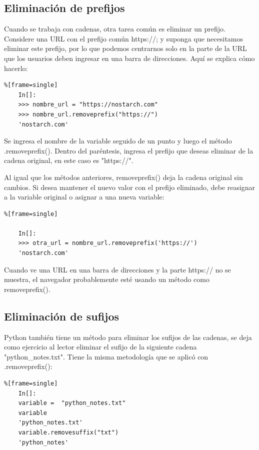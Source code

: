 \subsection{Eliminación de prefijos}%

Cuando se trabaja con cadenas, otra tarea común es eliminar un prefijo. Considere una URL con el prefijo común {\ttfamily https://}; y suponga que necesitamos  eliminar este prefijo, por lo que podemos centrarnos solo en la parte de la URL que los usuarios deben ingresar en una barra de direcciones. Aquí se explica cómo hacerlo:

\begin{lstlisting}%[frame=single]
	In[]:	
	>>> nombre_url = "https://nostarch.com"
	>>> nombre_url.removeprefix("https://")
	'nostarch.com'
\end{lstlisting}


\noindent Se ingresa el nombre de la variable seguido de un punto y luego el método
{\ttfamily .removeprefix()}. Dentro del paréntesis, ingresa el prefijo que deseas eliminar de la cadena original,
en este caso es {\ttfamily "https://{}"{}}.

Al igual que los métodos anteriores, {\ttfamily removeprefix()} deja la
cadena original sin cambios. Si desea mantener el nuevo valor con el prefijo
eliminado, debe reasignar  a la variable original o asignar a una nueva
variable:

\begin{lstlisting}%[frame=single]
	
	In[]:
	>>> otra_url = nombre_url.removeprefix('https://')
	'nostarch.com'
\end{lstlisting}

Cuando ve una URL en una barra de direcciones y la parte {\ttfamily https://} no se muestra,
el navegador probablemente esté usando un método como {\ttfamily removeprefix()}.



\subsection{Eliminación de sufijos}%


Python también tiene un método para eliminar los sufijos de las cadenas, se deja como ejercicio al lector eliminar 
el sufijo de la siguiente  cadena {\ttfamily "python\_notes.txt"{}}. 
Tiene la misma metodología que se aplicó con {\ttfamily .removeprefix()}:

\begin{lstlisting}%[frame=single]
	In[]:	
	variable =  "python_notes.txt"
	variable
	'python_notes.txt'
	variable.removesuffix("txt")
	'python_notes'
\end{lstlisting}



